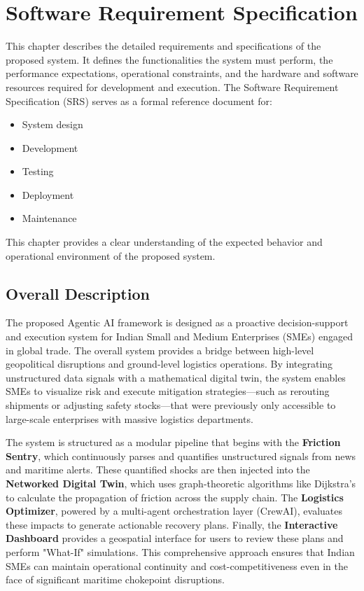\chapter[Software Requirement Specification]{Software Requirement Specification}
This chapter describes the detailed requirements and specifications of the proposed system. It defines the functionalities the system must perform, the performance expectations,
operational constraints, and the hardware and software resources required for development
and execution.
The Software Requirement Specification (SRS) serves as a formal reference document for:
\begin{itemize}
\item System design
\item Development
\item Testing
\item Deployment
\item Maintenance
\end{itemize}
This chapter provides a clear understanding of the expected behavior and operational
environment of the proposed system.
\section[Overall Description]{Overall Description}

The proposed Agentic AI framework is designed as a proactive decision-support and execution system for Indian Small and Medium Enterprises (SMEs) engaged in global trade. The overall system provides a bridge between high-level geopolitical disruptions and ground-level logistics operations. By integrating unstructured data signals with a mathematical digital twin, the system enables SMEs to visualize risk and execute mitigation strategies—such as rerouting shipments or adjusting safety stocks—that were previously only accessible to large-scale enterprises with massive logistics departments.

The system is structured as a modular pipeline that begins with the \textbf{Friction Sentry}, which continuously parses and quantifies unstructured signals from news and maritime alerts. These quantified shocks are then injected into the \textbf{Networked Digital Twin}, which uses graph-theoretic algorithms like Dijkstra's to calculate the propagation of friction across the supply chain. The \textbf{Logistics Optimizer}, powered by a multi-agent orchestration layer (CrewAI), evaluates these impacts to generate actionable recovery plans. Finally, the \textbf{Interactive Dashboard} provides a geospatial interface for users to review these plans and perform "What-If" simulations. This comprehensive approach ensures that Indian SMEs can maintain operational continuity and cost-competitiveness even in the face of significant maritime chokepoint disruptions.

